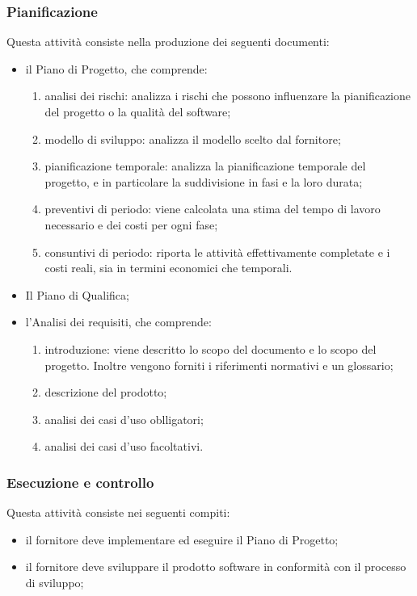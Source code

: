     \subsubsection{Pianificazione}\label{sec:pianificazione}
        Questa attività consiste nella produzione dei seguenti documenti:
        \begin{itemize}
            \item il Piano di Progetto, che comprende:
            \begin{enumerate}
                \item analisi dei rischi: analizza i rischi che possono influenzare la pianificazione del progetto o la qualità del software;
                \item modello di sviluppo: analizza il modello scelto dal fornitore;
                \item pianificazione temporale: analizza la pianificazione temporale del progetto, e in particolare la suddivisione in fasi e la loro durata;
                \item preventivi di periodo: viene calcolata una stima del tempo di lavoro necessario e dei costi per ogni fase;
                \item consuntivi di periodo: riporta le attività effettivamente completate e i costi reali, sia in termini economici che temporali. 
            \end{enumerate}
            \item Il Piano di Qualifica;
            \item l'Analisi dei requisiti, che comprende:
            \begin{enumerate}
                \item introduzione: viene descritto lo scopo del documento e lo scopo del progetto. Inoltre vengono forniti i riferimenti normativi e un glossario;  
                \item descrizione del prodotto;
                \item analisi dei casi d'uso oblligatori;
                \item analisi dei casi d'uso facoltativi.
            \end{enumerate}
        \end{itemize}

    \subsubsection{Esecuzione e controllo}\label{sec:esecuzione e controllo}
        Questa attività consiste nei seguenti compiti:
        \begin{itemize}
            \item il fornitore deve implementare ed eseguire il Piano di Progetto;
            \item il fornitore deve sviluppare il prodotto software in conformità con il processo di sviluppo;
        \end{itemize}

